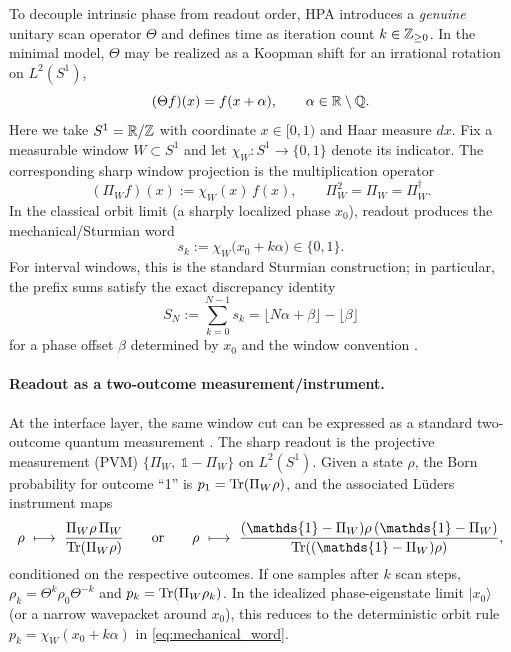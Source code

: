 To decouple intrinsic phase from readout order, HPA introduces a \emph{genuine} unitary scan operator $\Theta$ and defines time as iteration count $k\in\mathbb{Z}_{\ge 0}$.
In the minimal model, $\Theta$ may be realized as a Koopman shift for an irrational rotation on $L^2(S^1)$,
\begin{equation}
(\Theta f)(x)=f(x+\alpha),\qquad \alpha\in\mathbb{R}\setminus\mathbb{Q}.
\end{equation}
\noindent Here we take $S^1=\mathbb{R}/\mathbb{Z}$ with coordinate $x\in[0,1)$ and Haar measure $dx$.
Fix a measurable window $W\subset S^1$ and let $\chi_W:S^1\to\{0,1\}$ denote its indicator.
The corresponding sharp window projection is the multiplication operator
\begin{equation}
(\Pi_W f)(x):=\chi_W(x)\,f(x),
\qquad \Pi_W^2=\Pi_W=\Pi_W^\dagger.
\label{eq:window_projection_operator}
\end{equation}
In the classical orbit limit (a sharply localized phase $x_0$), readout produces the mechanical/Sturmian word
\begin{equation}
 s_k := \chi_W\bigl(x_0+k\alpha\bigr)\in\{0,1\}.
\label{eq:mechanical_word}
\end{equation}
For interval windows, this is the standard Sturmian construction; in particular, the prefix sums satisfy the exact discrepancy identity
\begin{equation}
S_N:=\sum_{k=0}^{N-1}s_k=\lfloor N\alpha+\beta\rfloor-\lfloor \beta\rfloor
\label{eq:sturmian_prefix_sum}
\end{equation}
for a phase offset $\beta$ determined by $x_0$ and the window convention \cite{MorseHedlund1940,Lothaire2002}.

\paragraph{Readout as a two-outcome measurement/instrument.}
At the interface layer, the same window cut can be expressed as a standard two-outcome quantum measurement \cite{Watrous2018}.
The sharp readout is the projective measurement (PVM) $\{\Pi_W,\ \mathds{1}-\Pi_W\}$ on $L^2(S^1)$.
Given a state $\rho$, the Born probability for outcome ``1'' is $p_1=\mathrm{Tr}(\Pi_W\rho)$, and the associated L\"uders instrument maps
\begin{equation}
\rho\ \longmapsto\ \frac{\Pi_W\rho\,\Pi_W}{\Tr(\Pi_W\rho)}
\qquad\text{or}\qquad
\rho\ \longmapsto\ \frac{(\mathds{1}-\Pi_W)\rho\,(\mathds{1}-\Pi_W)}{\Tr((\mathds{1}-\Pi_W)\rho)},
\end{equation}
conditioned on the respective outcomes.
If one samples after $k$ scan steps, $\rho_k=\Theta^k\rho_0\Theta^{-k}$ and $p_k=\mathrm{Tr}(\Pi_W\rho_k)$.
In the idealized phase-eigenstate limit $|x_0\rangle$ (or a narrow wavepacket around $x_0$), this reduces to the deterministic orbit rule $p_k=\chi_W(x_0+k\alpha)$ in \eqref{eq:mechanical_word}.

